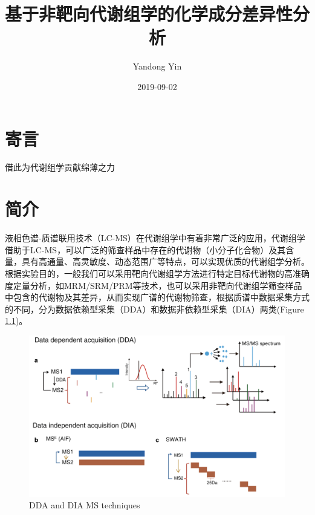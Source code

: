 \documentclass[]{ctexbook}
\title{基于非靶向代谢组学的化学成分差异性分析}
\author{Yandong Yin}
\date{2019-09-02}
\begin{document}
\maketitle


\thispagestyle{empty}

\begin{center}

\end{center}

\setlength{\abovedisplayskip}{-5pt}
\setlength{\abovedisplayshortskip}{-5pt}

{
\setcounter{tocdepth}{2}
\tableofcontents
}
\listoftables
\listoffigures
\hypertarget{Words}{%
\chapter*{寄言}\label{Words}}


借此为代谢组学贡献绵薄之力

\hypertarget{Intro}{%
\chapter{简介}\label{Intro}}

液相色谱-质谱联用技术（LC-MS）在代谢组学中有着非常广泛的应用，代谢组学借助于LC-MS，可以广泛的筛查样品中存在的代谢物（小分子化合物）及其含量，具有高通量、高灵敏度、动态范围广等特点，可以实现优质的代谢组学分析。根据实验目的，一般我们可以采用靶向代谢组学方法进行特定目标代谢物的高准确度定量分析，如MRM/SRM/PRM等技术，也可以采用非靶向代谢组学筛查样品中包含的代谢物及其差异，从而实现广谱的代谢物筛查，根据质谱中数据采集方式的不同，分为数据依赖型采集（DDA）和数据非依赖型采集（DIA）两类(Figure \ref{fig:DDAvsDIA})。

\begin{figure}
\centering
\includegraphics{Figures/Fig1.1.png}
\caption{\label{fig:DDAvsDIA}DDA and DIA MS techniques\citep{Wang:2019ig}}
\end{figure}
\end{document}
